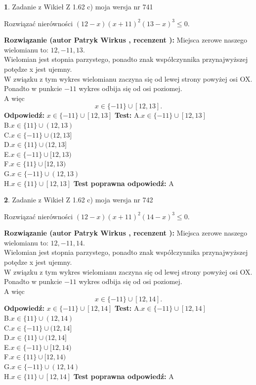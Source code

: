 \documentclass[12pt, a4paper]{article}
\theoremstyle{definition} %
\newtheorem{zad}{}
\newcommand{\zadStart}[1]{\begin{zad}#1\newline}
\newcommand{\zadStop}{\end{zad}}
\newcommand{\rozwStart}[2]{\noindent \textbf{Rozwiązanie (autor #1 , recenzent #2): }\newline}
\newcommand{\rozwStop}{\newline}
\newcommand{\odpStart}{\noindent \textbf{Odpowiedź:}\newline}
\newcommand{\odpStop}{\newline}
\newcommand{\testStart}{\noindent \textbf{Test:}\newline}
\newcommand{\testStop}{\newline}
\newcommand{\kluczStart}{\noindent \textbf{Test poprawna odpowiedź:}\newline}
\newcommand{\kluczStop}{\newline}
\begin{document}
\zadStart{Zadanie z Wikieł Z 1.62 c) moja wersja nr 741}

Rozwiązać nierówności $(12-x)(x+11)^{2}(13-x)^{3}\le0$.
\zadStop
\rozwStart{Patryk Wirkus}{}
Miejsca zerowe naszego wielomianu to: $12, -11, 13$.\\
Wielomian jest stopnia parzystego, ponadto znak współczynnika przy\linebreak najwyższej potędze x jest ujemny.\\ W związku z tym wykres wielomianu zaczyna się od lewej strony powyżej osi OX.\\
Ponadto w punkcie $-11$ wykres odbija się od osi poziomej.\\
A więc $$x \in \{-11\} \cup [12,13].$$
\rozwStop
\odpStart
$x \in \{-11\} \cup [12,13]$
\odpStop
\testStart
A.$x \in \{-11\} \cup [12,13]$\\
B.$x \in \{11\} \cup (12,13)$\\
C.$x \in \{-11\} \cup (12,13]$\\
D.$x \in \{11\} \cup (12,13]$\\
E.$x \in \{-11\} \cup [12,13)$\\
F.$x \in \{11\} \cup [12,13)$\\
G.$x \in \{-11\} \cup (12,13)$\\
H.$x \in \{11\} \cup [12,13]$
\testStop
\kluczStart
A
\kluczStop



\zadStart{Zadanie z Wikieł Z 1.62 c) moja wersja nr 742}

Rozwiązać nierówności $(12-x)(x+11)^{2}(14-x)^{3}\le0$.
\zadStop
\rozwStart{Patryk Wirkus}{}
Miejsca zerowe naszego wielomianu to: $12, -11, 14$.\\
Wielomian jest stopnia parzystego, ponadto znak współczynnika przy\linebreak najwyższej potędze x jest ujemny.\\ W związku z tym wykres wielomianu zaczyna się od lewej strony powyżej osi OX.\\
Ponadto w punkcie $-11$ wykres odbija się od osi poziomej.\\
A więc $$x \in \{-11\} \cup [12,14].$$
\rozwStop
\odpStart
$x \in \{-11\} \cup [12,14]$
\odpStop
\testStart
A.$x \in \{-11\} \cup [12,14]$\\
B.$x \in \{11\} \cup (12,14)$\\
C.$x \in \{-11\} \cup (12,14]$\\
D.$x \in \{11\} \cup (12,14]$\\
E.$x \in \{-11\} \cup [12,14)$\\
F.$x \in \{11\} \cup [12,14)$\\
G.$x \in \{-11\} \cup (12,14)$\\
H.$x \in \{11\} \cup [12,14]$
\testStop
\kluczStart
A
\kluczStop
\end{document}
